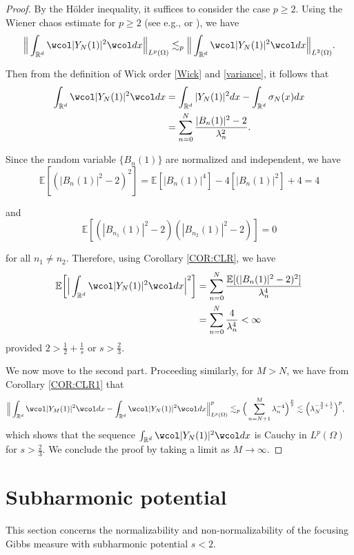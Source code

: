 \documentclass[%
11pt,  reqno]{amsart}
\theoremstyle{remarkstyle}
\newcommand{\1}{\hspace{0.2mm}\text{I}\hspace{0.2mm}}
\newcommand{\noi}{\noindent}
\newcommand{\R}{\mathbb{R}}
\newcommand{\E}{\mathbb{E}}
\newcommand{\ld}{\lambda}
\newcommand{\s}{\sigma}
\newcommand{\wick}[1]{\wcol#1\wcol}
\renewcommand{\O}{\Omega}
\newcommand{\les}{\lesssim}
\numberwithin{equation}{section}
\numberwithin{theorem}{section}
\begin{document}
	\begin{proof}
		By the H\"older inequality, it suffices to consider the case $p\ge 2$. Using the Wiener chaos estimate for $p \ge 2$ (see e.g., \cite[Theorem I.22]{Simon15} or \cite[Proposition 2.4]{TT10}), we have
		\[
		\Big\|\int_{\R^d} \wick{|Y_N (1)|^2} dx \Big\|_{L^p(\O)}  \les_p  \Big\|\int_{\R^d} \wick{|Y_N (1)|^2} dx \Big\|_{L^2(\O)} .
		\]
		
		\noi
		Then from the definition of Wick order \eqref{Wick} and \eqref{variance},
		it follows that
		\begin{align}
			\begin{split}
				\int_{\R^d} \wick{|Y_N (1)|^2} dx & = \int_{\R^d} |Y_N (1)|^2 dx - \int_{\R^d} \s_N (x) dx\\
				& = \sum_{n=0}^N \frac{|B_n(1)|^2 - 2}{\ld_n^2}.
			\end{split}
			\label{wickY}
		\end{align}
		
		\noi
		Since the random variable $\{B_n(1)\}$ are normalized and independent, we have
		\[
		\E [(|B_{n}(1)|^2 - 2)^2] = \E [|B_{n}(1)|^4] - 4 [|B_{n}(1)|^2] + 4 = 4
		\]
		
		\noi
		and
		\[
		\E [(|B_{n_1}(1)|^2 - 2)(|B_{n_2}(1)|^2 - 2)] = 0
		\]
		
		\noi
		for all $n_1 \neq n_2$.
		Therefore, using Corollary \ref{COR:CLR}, we have
		\begin{align*}
			\E \bigg[ \Big|\int_{\R^d}  \wick{|Y_N (1)|^2} dx \Big|^2 \bigg] &= \sum_{n=0}^N \frac{\E [(|B_n(1)|^2 - 2)^2]}{\ld_n^4}\\
			& = \sum_{n=0}^N \frac{4}{\ld_n^4} < \infty
		\end{align*}
		provided $2>\frac12 +\frac1s$ or $s>\frac23$.
		
		We now move to the second part. Proceeding similarly, for $M > N$, we have from Corollary \ref{COR:CLR1} that 
		\begin{align*}
			\Big\|\int_{\R^d} \wick{|Y_M (1)|^2} dx - \int_{\R^d} \wick{|Y_N (1)|^2} dx \Big\|_{L^p(\O)}^p & \les_p 
			\Big(\sum_{n=N+1}^M \ld_n^{-4}\Big)^\frac p2 \les \Big(\ld_N^{- \frac32 + \frac1s}\Big)^p,
		\end{align*}
		which shows that the sequence $\int_{\R^d} \wick{|Y_N (1)|^2}dx$ is Cauchy in $L^p(\O)$ for $s > \frac23$. We conclude the proof by taking a limit as $M \to \infty$.
	\end{proof}
	
	\section{Subharmonic potential}
	\label{SEC:subharmonic}
	This section concerns the normalizability and non-normalizability 
	of the focusing Gibbs measure with subharmonic potential $s<2$. 
	
\end{document}
